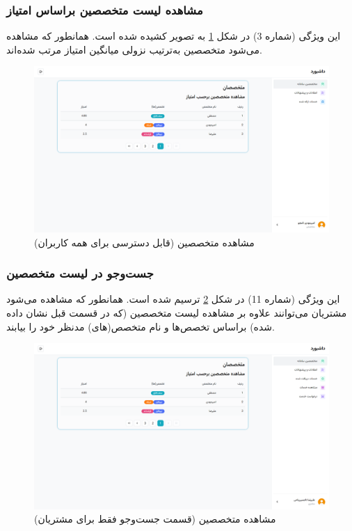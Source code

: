\subsubsection{مشاهده لیست متخصصین براساس امتیاز}
این ویژگی (شماره 3) در شکل
\ref{spec-specialists}
به تصویر کشیده شده است. همانطور که مشاهده می‌شود متخصصین به‌ترتیب نزولی میانگین امتیاز مرتب شده‌اند.

\begin{figure}[h]
	\centering
	\includegraphics[width=\textwidth]{figs/initial-ui/spec-specialists}
	\caption{مشاهده متخصصین (قابل دسترسی برای همه کاربران)}
	\label{spec-specialists}
\end{figure}

\subsubsection{جست‌وجو در لیست متخصصین}
این ویژگی (شماره 11) در شکل
\ref{ctmr-specialists}
ترسیم شده است. همانطور که مشاهده می‌شود مشتریان می‌توانند علاوه بر مشاهده لیست متخصصین (که در قسمت قبل نشان داده شده) براساس تخصص‌ها و نام متخصص(های) مدنظر خود را بیابند.

\begin{figure}[h]
	\centering
	\includegraphics[width=\textwidth]{figs/initial-ui/ctmr-specialists}
	\caption{مشاهده متخصصین (قسمت جست‌وجو فقط برای مشتریان)}
	\label{ctmr-specialists}
\end{figure}


